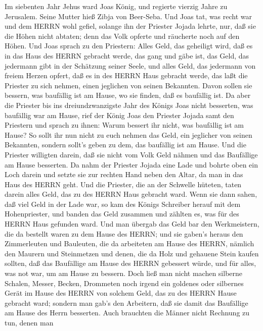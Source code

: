  Im siebenten Jahr Jehus ward Joas König, und regierte
vierzig Jahre zu Jerusalem. Seine Mutter hieß Zibja von Beer-Seba.
 Und Joas tat, was recht war und dem HERRN wohl gefiel,
solange ihn der Priester Jojada lehrte,  nur, daß sie die
Höhen nicht abtaten; denn das Volk opferte und räucherte noch auf den
Höhen.  Und Joas sprach zu den Priestern: Alles Geld, das
geheiligt wird, daß es in das Haus des HERRN gebracht werde, das gang
und gäbe ist, das Geld, das jedermann gibt in der Schätzung seiner
Seele, und alles Geld, das jedermann von freiem Herzen opfert, daß es in
des HERRN Haus gebracht werde,  das laßt die Priester zu
sich nehmen, einen jeglichen von seinen Bekannten. Davon sollen sie
bessern, was baufällig ist am Hause, wo sie finden, daß es baufällig
ist.  Da aber die Priester bis ins dreiundzwanzigste Jahr
des Königs Joas nicht besserten, was baufällig war am Hause,
 rief der König Joas den Priester Jojada samt den Priestern
und sprach zu ihnen: Warum bessert ihr nicht, was baufällig ist am
Hause? So sollt ihr nun nicht zu euch nehmen das Geld, ein jeglicher von
seinen Bekannten, sondern sollt's geben zu dem, das baufällig ist am
Hause.  Und die Priester willigten darein, daß sie nicht vom
Volk Geld nähmen und das Baufällige am Hause besserten.  Da
nahm der Priester Jojada eine Lade und bohrte oben ein Loch darein und
setzte sie zur rechten Hand neben den Altar, da man in das Haus des
HERRN geht. Und die Priester, die an der Schwelle hüteten, taten darein
alles Geld, das zu des HERRN Haus gebracht ward.  Wenn sie
dann sahen, daß viel Geld in der Lade war, so kam des Königs Schreiber
herauf mit dem Hohenpriester, und banden das Geld zusammen und zählten
es, was für des HERRN Haus gefunden ward.  Und man übergab
das Geld bar den Werkmeistern, die da bestellt waren zu dem Hause des
HERRN; und sie gaben's heraus den Zimmerleuten und Bauleuten, die da
arbeiteten am Hause des HERRN,  nämlich den Maurern und
Steinmetzen und denen, die da Holz und gehauene Stein kaufen sollten,
daß das Baufällige am Hause des HERRN gebessert würde, und für alles,
was not war, um am Hause zu bessern.  Doch ließ man nicht
machen silberne Schalen, Messer, Becken, Drommeten noch irgend ein
goldenes oder silbernes Gerät im Hause des HERRN von solchem Geld, das
zu des HERRN Hause gebracht ward;  sondern man gab's den
Arbeitern, daß sie damit das Baufällige am Hause des Herrn besserten.
 Auch brauchten die Männer nicht Rechnung zu tun, denen man
